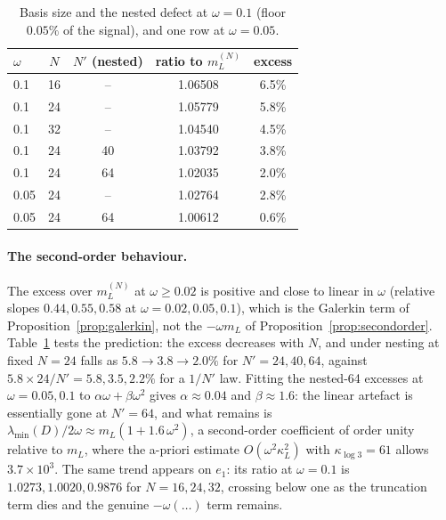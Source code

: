 \begin{table}[ht]\centering\small
\caption{Basis size and the nested defect at $\omega=0.1$ (floor $0.05\%$ of
the signal), and one row at $\omega=0.05$.}\label{tab:nested}
\begin{tabular}{@{}lcccc@{}}
\toprule
$\omega$ & $N$ & $N'$ (nested) & ratio to $m_L^{(N)}$ & excess\\
\midrule
0.1 & 16 & -- & 1.06508 & 6.5\%\\
0.1 & 24 & -- & 1.05779 & 5.8\%\\
0.1 & 32 & -- & 1.04540 & 4.5\%\\
0.1 & 24 & 40 & 1.03792 & 3.8\%\\
0.1 & 24 & 64 & 1.02035 & 2.0\%\\
0.05 & 24 & -- & 1.02764 & 2.8\%\\
0.05 & 24 & 64 & 1.00612 & 0.6\%\\
\bottomrule
\end{tabular}
\end{table}

\paragraph{The second-order behaviour.} The excess over $m_L^{(N)}$ at
$\omega\geq0.02$ is positive and close to linear in $\omega$ (relative slopes
$0.44,0.55,0.58$ at $\omega=0.02,0.05,0.1$), which is the Galerkin term of
Proposition~\ref{prop:galerkin}, not the $-\omega m_L$ of
Proposition~\ref{prop:secondorder}. Table~\ref{tab:nested} tests the
prediction: the excess decreases with $N$, and under nesting at fixed $N=24$
falls as $5.8\to3.8\to2.0\%$ for $N'=24,40,64$, against $5.8\times24/N'=5.8,3.5,2.2\%$
for a $1/N'$ law. Fitting the nested-64 excesses at $\omega=0.05,0.1$ to
$\alpha\omega+\beta\omega^2$ gives $\alpha\approx0.04$ and $\beta\approx1.6$:
the linear artefact is essentially gone at $N'=64$, and what remains is
$\lambda_{\min}(D)/2\omega\approx m_L(1+1.6\,\omega^2)$, a second-order
coefficient of order unity relative to $m_L$, where the a-priori estimate
$O(\omega^2\kappa_L^2)$ with $\kappa_{\log3}=61$ \cite{CriticalPath} allows
$3.7\times10^3$. The same trend appears on $e_1$: its ratio at $\omega=0.1$ is
$1.0273,1.0020,0.9876$ for $N=16,24,32$, crossing below one as the truncation
term dies and the genuine $-\omega(\dots)$ term remains.

